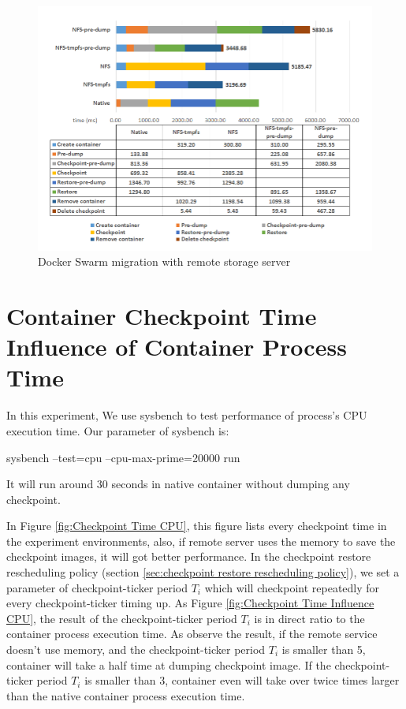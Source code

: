 \begin{figure}[h]
\includegraphics[width=17cm]{figure/migration_time.png}
\caption{Docker Swarm migration with remote storage server}
\label{fig:Docker Swarm migration with remote storage server}
\end{figure}

\section{Container Checkpoint Time Influence of Container Process Time}
In this experiment, We use sysbench\cite{kopytov2004sysbench} to test performance of process's CPU execution time. Our parameter of sysbench is:
\begin{center}
sysbench  --test=cpu --cpu-max-prime=20000 run
\end{center}
It will run around 30 seconds in native container without dumping any checkpoint.

In Figure \ref{fig:Checkpoint Time CPU}, this figure lists every checkpoint time in the experiment environments, also, if remote server uses the memory to save the checkpoint images, it will got better performance.
In the checkpoint restore rescheduling policy (section \ref{sec:checkpoint restore rescheduling policy}), we set a parameter of checkpoint-ticker period $ T_i $ which will checkpoint repeatedly for every checkpoint-ticker timing up.
As Figure \ref{fig:Checkpoint Time Influence CPU}, the result of the checkpoint-ticker period $ T_i $ is in direct ratio to the container process execution time.
As observe the result, if the remote service doesn't use memory, and the checkpoint-ticker period $ T_i $ is smaller than 5, container will take a half time at dumping checkpoint image. If the checkpoint-ticker period $ T_i $ is smaller than 3, container even will take over twice times larger than the native container process execution time.

